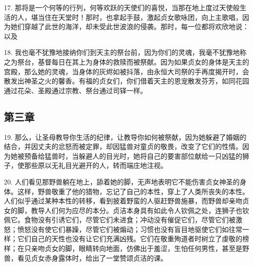 17. 那将是一个何等的行列，何等欢跃的天使们的喜悦，当那在地上度过天使般生活的人，堪当住在天堂时！那时，也拿起手鼓，激起贞女歌咏团，向上主歌唱，因为她们穿越了此世的海洋，却未受此世波浪的侵袭。那时，每一位都将欢欣地说：以及\par

18. 我也毫不犹豫地接纳你们到天主的祭台前，因为你们的灵魂，我毫不犹豫地称之为祭台，基督每日在其上为身体的救赎而被祭献。因为如果贞女的身体是天主的宫殿，那么她的灵魂，当身体的灰烬如被抖落，由永恒大司祭的手再度揭开时，会散发出神圣之火的馨香。有福的贞女们，你们借着天主的恩宠散发芬芳，如同花园通过花朵、圣殿通过宗教、祭台通过司铎一样。\par


\subsection{第三章}

\par

19. 那么，让圣母教导你生活的纪律，让教导你如何被祭献，因为她躲避了婚姻的结合，并因丈夫的忿怒而被定罪，却因猛兽对童贞的敬畏，改变了它们的性情。因为她被预备给猛兽时，当躲避人的目光时，她将自己的要害部位献给一只凶猛的狮子，使那些原以无礼目光避开的人，转而端庄地注视。\par

20. 人们看见那野兽躺在地上，舔着她的脚，无声地表明它不能伤害贞女神圣的身体。这样，野兽敬重了他的猎物，忘记了自己的本性，穿上了人类所丧失的本性。人们似乎通过某种本性的转移，看到披着野蛮的人驱赶野兽施暴，而野兽却亲吻贞女的脚，教导人们何为应尽的本分。贞洁本身具有如此令人钦佩之处，连狮子也钦佩它。食物没有引诱它们，尽管它们未进食；冲动没有催促它们，尽管它们被激怒；愤怒没有使它们暴躁，尽管它们被煽动；习惯也没有盲目地驱使它们如往常一样；它们自己的天性也没有让它们充满凶残。它们在敬重殉道者时树立了虔敬的榜样；在只亲吻贞女的脚，眼睛转向地面，仿佛出于羞涩，生怕任何男性，甚至是野兽，看见贞女赤身露体时，给出了一堂赞颂贞洁的课。\par

